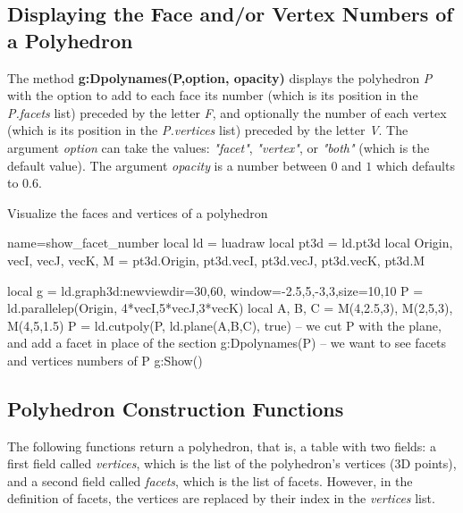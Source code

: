 \subsection{Displaying the Face and/or Vertex Numbers of a Polyhedron}

The method \textbf{g:Dpolynames(P,option, opacity)} displays the polyhedron \emph{P} with the option to add to each face its number (which is its position in the \emph{P.facets} list) preceded by the letter \emph{F}, and optionally the number of each vertex (which is its position in the \emph{P.vertices} list) preceded by the letter \emph{V}. The argument \emph{option} can take the values: \emph{"facet"}, \emph{"vertex"}, or \emph{"both"} (which is the default value). The argument \emph{opacity} is a number between $0$ and $1$ which defaults to $0.6$.

\begin{demo}{Visualize the faces and vertices of a polyhedron}
\begin{luadraw}{name=show_facet_number}
local ld = luadraw
local pt3d = ld.pt3d
local Origin, vecI, vecJ, vecK, M = pt3d.Origin, pt3d.vecI, pt3d.vecJ, pt3d.vecK, pt3d.M

local g = ld.graph3d:new{viewdir={30,60}, window={-2.5,5,-3,3},size={10,10}}
P = ld.parallelep(Origin, 4*vecI,5*vecJ,3*vecK)
local A, B, C = M(4,2.5,3), M(2,5,3), M(4,5,1.5)
P = ld.cutpoly(P, ld.plane(A,B,C), true) -- we cut P with the plane, and add a facet in place of the section
g:Dpolynames(P) -- we want to see facets and vertices numbers of P
g:Show()
\end{luadraw}
\end{demo}

\subsection{Polyhedron Construction Functions}

The following functions return a polyhedron, that is, a table with two fields: a first field called \emph{vertices}, which is the list of the polyhedron's vertices (3D points), and a second field called \emph{facets}, which is the list of facets. However, in the definition of facets, the vertices are replaced by their index in the \emph{vertices} list.

